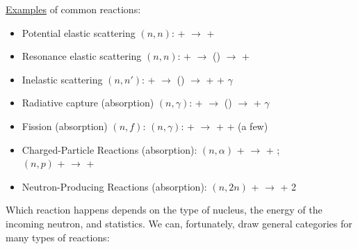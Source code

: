 \documentclass[12pt]{article}
\begin{document}
\underline{Examples} of common reactions:
\begin{itemize}
\item Potential elastic scattering $(n,n)$:  +  $\rightarrow$  + 

\item Resonance elastic scattering $(n,n)$:  +  $\rightarrow$ () $\rightarrow$  + 

\item Inelastic scattering $(n,n')$:  +  $\rightarrow$ () $\rightarrow$  +  + $\gamma$

\item Radiative capture (absorption) $(n,\gamma)$:  +  $\rightarrow$ () $\rightarrow$  + $\gamma$

\item Fission (absorption) $(n,f)$: $(n,\gamma)$:  +  $\rightarrow$  +  + (a few)

\item Charged-Particle Reactions (absorption): $(n,\alpha)$  +  $\rightarrow$  + ; \\
\hspace*{17 em}$(n,p)$   +  $\rightarrow$  + 

\item Neutron-Producing Reactions (absorption): $(n,2n)$	  +  $\rightarrow$  + 2
\end{itemize}

Which reaction happens depends on the type of nucleus, the energy of the incoming neutron, and statistics. We can, fortunately, draw general categories for many types of reactions:
\end{document}
